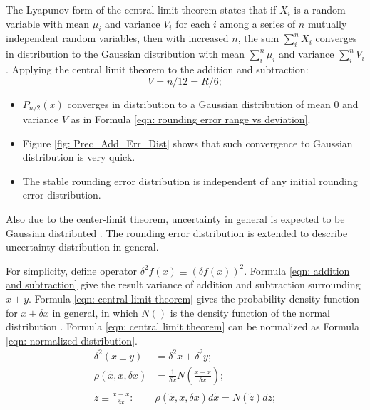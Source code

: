 \documentclass[twoside]{article}
\numberwithin{equation}{section}
\newcommand{\eqspace}{\;\;\;}
\begin{document}
The Lyapunov form of the central limit theorem \cite{Probability_Statistics} states that if $X_i$ is a random variable with mean $\mu_i$ and variance $V_i$ for each $i$ among a series of $n$ mutually independent random variables, then with increased $n$, the sum $\sum\limits_{i}^{n} X_i$ converges in distribution to the Gaussian distribution with mean $\sum\limits_{i}^{n} \mu_i$ and variance $\sum\limits_{i}^{n} V_i$. Applying the central limit theorem to the addition and subtraction: 
\begin{equation}
\label{eqn: rounding error range vs deviation}
V = n/12 = R/6;
\end{equation}
\begin{itemize}
\item $P_{n/2}(x)$ converges in distribution to a Gaussian distribution of mean $0$ and variance $V$ as in Formula \eqref{eqn: rounding error range vs deviation}.

\item Figure \ref{fig: Prec_Add_Err_Dist} shows that such convergence to Gaussian distribution is very quick. 

\item The stable rounding error distribution is independent of any initial rounding error distribution. 
\end{itemize} 

Also due to the center-limit theorem, uncertainty in general is expected to be Gaussian distributed \cite{Statistical_Methods} \cite{Probability_Statistics}. 
The rounding error distribution is extended to describe uncertainty distribution in general.

For simplicity, define operator $\delta^2 f(x) \equiv (\delta f(x))^2$. 
Formula \eqref{eqn: addition and subtraction} give the result variance of addition and subtraction surrounding $x \pm y$.
Formula \eqref{eqn: central limit theorem} gives the probability density function for $x \pm \delta x$ in general, in which $N()$ is the density function of the  normal distribution \cite{Probability_Statistics}.
Formula \eqref{eqn: central limit theorem} can be normalized as Formula \eqref{eqn: normalized distribution}.
\begin{align}
\label{eqn: addition and subtraction}
\delta^2 (x \pm y) &= \delta^2 x + \delta^2 y; \\
\label{eqn: central limit theorem}
\rho(\tilde{x}, x, \delta x) & = \frac{1}{\delta x} N(\frac{\tilde{x} - x}{\delta x}); \\
\label{eqn: normalized distribution}
\tilde{z} \equiv \frac{\tilde{x} - x}{\delta x}:\eqspace & \rho(\tilde{x}, x, \delta x) d \tilde{x} = N(\tilde{z}) d \tilde{z};
\end{align}
\end{document}
